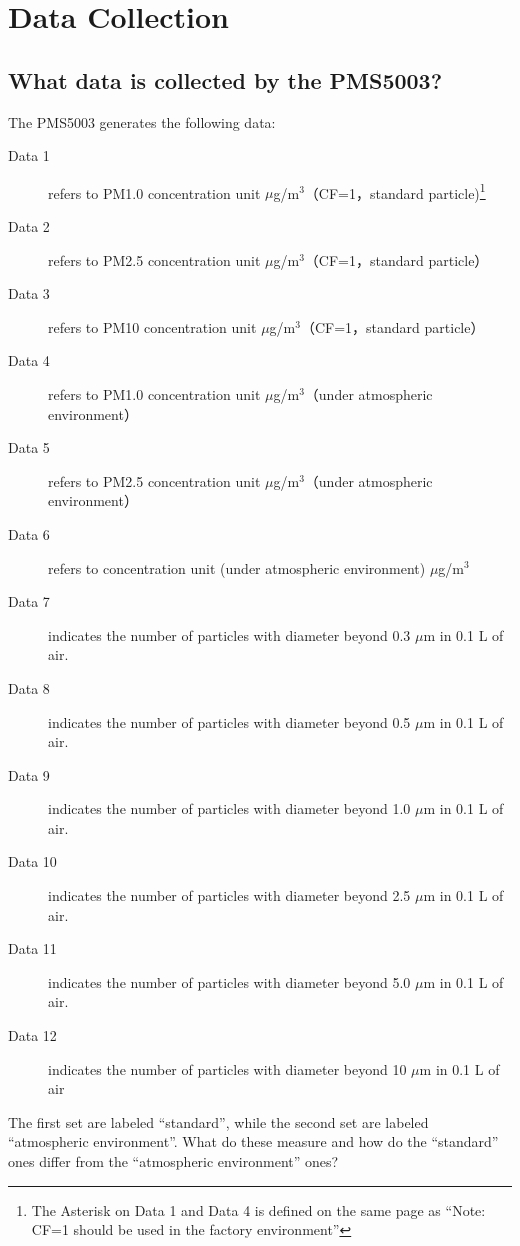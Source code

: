 \documentclass{article}\usepackage[]{graphicx}\usepackage[]{color}
\begin{document}
\section{Data Collection}
\subsection{What data is collected by the PMS5003?}

The PMS5003 generates the following data: 

\begin{description}
  \item[Data 1] refers to PM1.0 concentration unit $\mu$g/m$^3$（CF=1，standard particle)\footnote{The Asterisk on Data 1 and Data 4 is defined on the same page as ``Note: CF=1 should be used in the factory environment''}
  \item[Data 2] refers to PM2.5 concentration unit $\mu$g/m$^3$（CF=1，standard particle）
  \item[Data 3] refers to PM10 concentration unit $\mu$g/m$^3$（CF=1，standard particle）
  \item[Data 4] refers to PM1.0 concentration unit $\mu$g/m$^3$（under atmospheric environment）
  \item[Data 5] refers to PM2.5 concentration unit $\mu$g/m$^3$（under atmospheric environment）
  \item[Data 6] refers to concentration unit (under atmospheric environment) $\mu$g/m$^3$
  \item[Data 7] indicates the number of particles with diameter beyond 0.3 $\mu$m in 0.1 L of air.
  \item[Data 8] indicates the number of particles with diameter beyond 0.5 $\mu$m in 0.1 L of air.
  \item[Data 9] indicates the number of particles with diameter beyond 1.0 $\mu$m in 0.1 L of air.
  \item[Data 10] indicates the number of particles with diameter beyond 2.5 $\mu$m in 0.1 L of air.
  \item[Data 11] indicates the number of particles with diameter beyond 5.0 $\mu$m in 0.1 L of air.
  \item[Data 12] indicates the number of particles with diameter beyond 10 $\mu$m in 0.1 L of air

\end{description}

The first set are labeled ``standard'', while the second set are labeled ``atmospheric environment''. What do these measure and how do the ``standard'' ones differ from the ``atmospheric environment'' ones?
\end{document}

